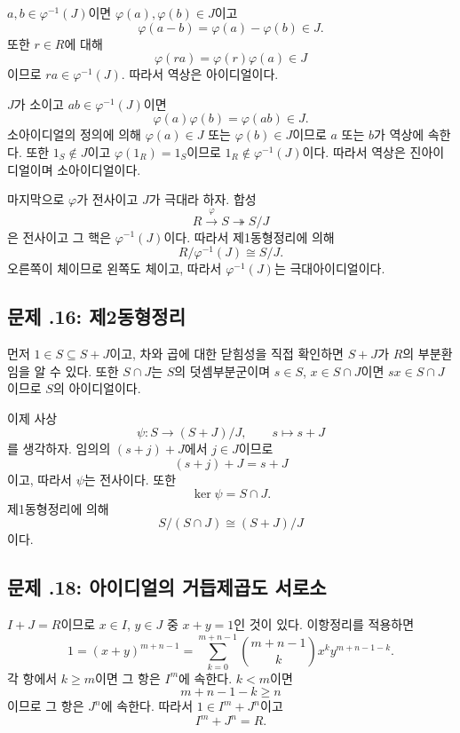 \begin{solution}
$a,b\in\varphi^{-1}(J)$이면 $\varphi(a),\varphi(b)\in J$이고
\[
  \varphi(a-b)=\varphi(a)-\varphi(b)\in J.
\]
또한 $r\in R$에 대해
\[
  \varphi(ra)=\varphi(r)\varphi(a)\in J
\]
이므로 $ra\in\varphi^{-1}(J)$. 따라서 역상은 아이디얼이다.

$J$가 소이고 $ab\in\varphi^{-1}(J)$이면
\[
  \varphi(a)\varphi(b)=\varphi(ab)\in J.
\]
소아이디얼의 정의에 의해 $\varphi(a)\in J$ 또는 $\varphi(b)\in J$이므로 $a$ 또는 $b$가 역상에 속한다. 또한 $1_S\notin J$이고 $\varphi(1_R)=1_S$이므로 $1_R\notin\varphi^{-1}(J)$이다. 따라서 역상은 진아이디얼이며 소아이디얼이다.

마지막으로 $\varphi$가 전사이고 $J$가 극대라 하자. 합성
\[
  R\xrightarrow{\varphi}S\twoheadrightarrow S/J
\]
은 전사이고 그 핵은 $\varphi^{-1}(J)$이다. 따라서 제1동형정리에 의해
\[
  R/\varphi^{-1}(J)\cong S/J.
\]
오른쪽이 체이므로 왼쪽도 체이고, 따라서 $\varphi^{-1}(J)$는 극대아이디얼이다.
\end{solution}

\subsection*{문제 \thechapter.16: 제2동형정리}

\begin{solution}
먼저 $1\in S\subseteq S+J$이고, 차와 곱에 대한 닫힘성을 직접 확인하면 $S+J$가 $R$의 부분환임을 알 수 있다. 또한 $S\cap J$는 $S$의 덧셈부분군이며 $s\in S$, $x\in S\cap J$이면 $sx\in S\cap J$이므로 $S$의 아이디얼이다.

이제 사상
\[
  \psi:S\to(S+J)/J,
  \qquad s\mapsto s+J
\]
를 생각하자. 임의의 $(s+j)+J$에서 $j\in J$이므로
\[
  (s+j)+J=s+J
\]
이고, 따라서 $\psi$는 전사이다. 또한
\[
  \ker\psi=S\cap J.
\]
제1동형정리에 의해
\[
  S/(S\cap J)\cong(S+J)/J
\]
이다.
\end{solution}

\subsection*{문제 \thechapter.18: 아이디얼의 거듭제곱도 서로소}

\begin{solution}
$I+J=R$이므로 $x\in I$, $y\in J$ 중 $x+y=1$인 것이 있다. 이항정리를 적용하면
\[
  1=(x+y)^{m+n-1}
   =\sum_{k=0}^{m+n-1}
     \binom{m+n-1}{k}x^ky^{m+n-1-k}.
\]
각 항에서 $k\ge m$이면 그 항은 $I^m$에 속한다. $k<m$이면
\[
  m+n-1-k\ge n
\]
이므로 그 항은 $J^n$에 속한다. 따라서 $1\in I^m+J^n$이고
\[
  I^m+J^n=R.
\]
\end{solution}

